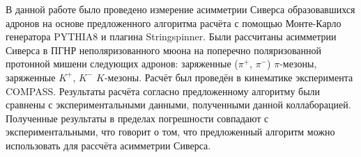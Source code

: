 \documentclass{extreport}
\begin{document}
В данной работе было проведено измерение асимметрии Сиверса образовавшихся адронов на основе предложенного алгоритма расчёта с помощью Монте-Карло генератора PYTHIA8 и плагина Stringspinner.  Были рассчитаны асимметрии Сиверса в ПГНР неполяризованного мюона на поперечно поляризованной протонной мишени следующих адронов: заряженные ($\pi^{+}$, $\pi^{-}$) $\pi$-мезоны, заряженные $K^{+}$, $K^{-}$ $K$-мезоны. Расчёт был проведён в кинематике эксперимента COMPASS. Результаты расчёта согласно предложенному алгоритму были сравнены с экспериментальными данными, полученными данной коллаборацией. Полученные результаты в пределах погрешности совпадают с экспериментальными, что говорит о том, что предложенный алгоритм можно использовать для рассчёта асимметрии Сиверса.
\newpage
\printbibliography
\end{document}

